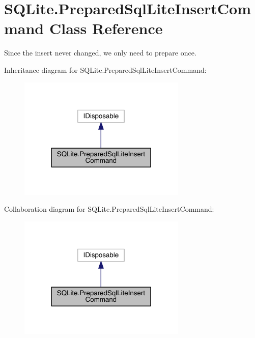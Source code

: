 \hypertarget{class_s_q_lite_1_1_prepared_sql_lite_insert_command}{\section{S\+Q\+Lite.\+Prepared\+Sql\+Lite\+Insert\+Command Class Reference}
\label{class_s_q_lite_1_1_prepared_sql_lite_insert_command}
}


Since the insert never changed, we only need to prepare once.  




Inheritance diagram for S\+Q\+Lite.\+Prepared\+Sql\+Lite\+Insert\+Command\+:
\nopagebreak
\begin{figure}[H]
\begin{center}
\leavevmode
\includegraphics[width=226pt]{class_s_q_lite_1_1_prepared_sql_lite_insert_command__inherit__graph}
\end{center}
\end{figure}


Collaboration diagram for S\+Q\+Lite.\+Prepared\+Sql\+Lite\+Insert\+Command\+:
\nopagebreak
\begin{figure}[H]
\begin{center}
\leavevmode
\includegraphics[width=226pt]{class_s_q_lite_1_1_prepared_sql_lite_insert_command__coll__graph}
\end{center}
\end{figure}
